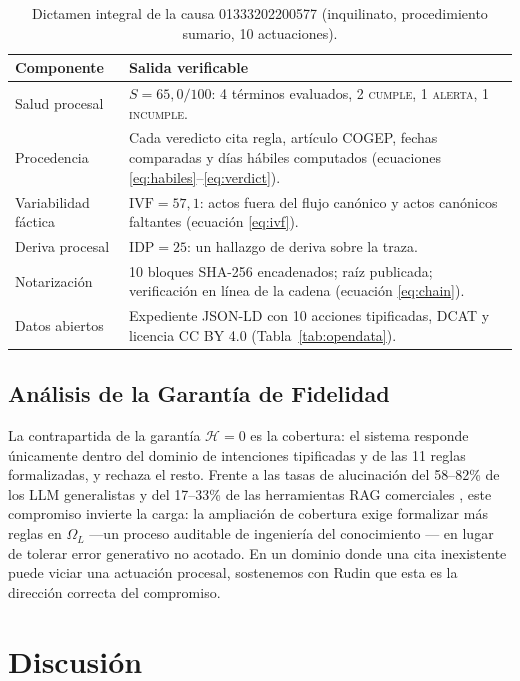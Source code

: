 \documentclass[computers,article,submit,pdftex,moreauthors]{Definitions/mdpi}
\begin{document}
\begin{table}[H]
\caption{Dictamen integral de la causa 01333202200577 (inquilinato, procedimiento sumario, 10 actuaciones).}
\label{tab:causa}
\begin{tabularx}{\textwidth}{lX}
\toprule
\textbf{Componente} & \textbf{Salida verificable}\\
\midrule
Salud procesal & $S = 65{,}0/100$: 4 términos evaluados, 2 \textsc{cumple}, 1 \textsc{alerta}, 1 \textsc{incumple}.\\
Procedencia & Cada veredicto cita regla, artículo COGEP, fechas comparadas y días hábiles computados (ecuaciones \eqref{eq:habiles}--\eqref{eq:verdict}).\\
Variabilidad fáctica & $\mathrm{IVF} = 57{,}1$: actos fuera del flujo canónico y actos canónicos faltantes (ecuación \eqref{eq:ivf}).\\
Deriva procesal & $\mathrm{IDP} = 25$: un hallazgo de deriva sobre la traza.\\
Notarización & 10 bloques SHA-256 encadenados; raíz publicada; verificación en línea de la cadena (ecuación \eqref{eq:chain}).\\
Datos abiertos & Expediente JSON-LD con 10 acciones tipificadas, DCAT y licencia CC BY 4.0 (Tabla~\ref{tab:opendata}).\\
\bottomrule
\end{tabularx}
\end{table}

\subsection{Análisis de la Garantía de Fidelidad}
La contrapartida de la garantía $\mathcal{H} = 0$ es la cobertura: el sistema responde únicamente dentro del dominio de intenciones tipificadas y de las 11 reglas formalizadas, y rechaza el resto. Frente a las tasas de alucinación del 58--82\% de los LLM generalistas \cite{Dahl2024} y del 17--33\% de las herramientas RAG comerciales \cite{Magesh2025}, este compromiso invierte la carga: la ampliación de cobertura exige formalizar más reglas en $\Omega_L$ ---un proceso auditable de ingeniería del conocimiento \cite{Uschold1996}--- en lugar de tolerar error generativo no acotado. En un dominio donde una cita inexistente puede viciar una actuación procesal, sostenemos con Rudin \cite{Rudin2019} que esta es la dirección correcta del compromiso.

\section{Discusión}
\label{sec:discussion}
\end{document}
